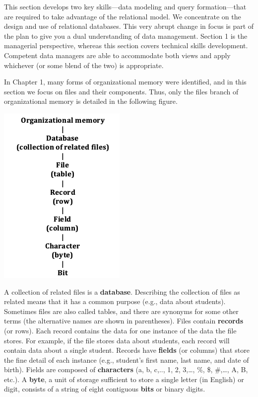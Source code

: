 \documentclass[
]{article}
\begin{document}
This section develops two key skills---data modeling and query
formation---that are required to take advantage of the relational model.
We concentrate on the design and use of relational databases. This very
abrupt change in focus is part of the plan to give you a dual
understanding of data management. Section 1 is the managerial
perspective, whereas this section covers technical skills development.
Competent data managers are able to accommodate both views and apply
whichever (or some blend of the two) is appropriate.

In Chapter 1, many forms of organizational memory were identified, and
in this section we focus on files and their components. Thus, only the
files branch of organizational memory is detailed in the following
figure.

\includegraphics{Figures/Section 2/Org Memory Files.png}

A collection of related files is a \textbf{database}. Describing the
collection of files as related means that it has a common purpose (e.g.,
data about students). Sometimes files are also called tables, and there
are synonyms for some other terms (the alternative names are shown in
parentheses). Files contain \textbf{records} (or rows). Each record contains
the data for one instance of the data the file stores. For example, if
the file stores data about students, each record will contain data about
a single student. Records have \textbf{fields} (or columns) that store the
fine detail of each instance (e.g., student's first name, last name, and
date of birth). Fields are composed of \textbf{characters} (a, b, c,.., 1,
2, 3,\ldots, \%, \$, \#,\ldots, A, B, etc.). A \textbf{byte}, a unit of
storage sufficient to store a single letter (in English) or digit,
consists of a string of eight contiguous \textbf{bits} or binary digits.
\end{document}
